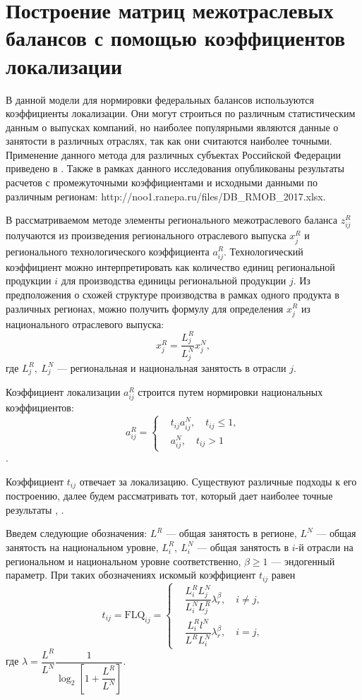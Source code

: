 \documentclass[12pt, a4paper]{article}
\begin{document}
\section{Построение матриц межотраслевых балансов с помощью коэффициентов локализации}

В данной модели для нормировки федеральных балансов используются коэффициенты локализации. Они могут строиться по различным статистическим данным о выпусках компаний, но наиболее популярными являются данные о занятости в различных отраслях, так как они считаются наиболее точными. Применение данного метода для различных субъектах Российской Федерации приведено в \cite{MOB_loc_base}. Также в рамках данного исследования опубликованы результаты расчетов с промежуточными коэффициентами и исходными данными по различным регионам: 
http://noo1.ranepa.ru/files/DB\_RMOB\_2017.xlsx. 

В рассматриваемом методе элементы регионального межотраслевого баланса $z_{ij}^R$ получаются из произведения регионального отраслевого выпуска $x_j^R$ и регионального технологического коэффициента $a_{ij}^R$. Технологический коэффициент можно интерпретировать как количество единиц региональной продукции $i$ для производства единицы региональной продукции $j$. Из предположения о схожей структуре производства в рамках одного продукта в различных регионах, можно получить формулу для определения $x_{j}^R$ из национального отраслевого выпуска:
$$
x_j^R = \dfrac{L_j^R}{L_j^N}x_j^N,
$$
где $L_j^R,\ L_j^N$ --- региональная и национальная занятость в отрасли $j$.

Коэффициент локализации $a_{ij}^R$ строится путем нормировки национальных коэффициентов: 
$$a_{ij}^R = \left\{ \begin{aligned}&t_{ij}a_{ij}^N,\quad t_{ij} \leqslant 1,\\&a_{ij}^N,\quad t_{ij} > 1\end{aligned}\right.$$. 

Коэффициент $t_{ij}$ отвечает за локализацию. Существуют различные подходы к его построению, далее будем рассматривать тот, который дает наиболее точные результаты \cite{MOB_Accur}, \cite{MOB_Monte_Carlo}.

Введем следующие обозначения: $L^R$ --- общая занятость в регионе, $L^N$ --- общая занятость на национальном уровне, $L_i^R,\ L_i^N$ --- общая занятость в $i$-й отрасли на региональном и национальном уровне соответственно, $\beta \geqslant 1$ --- эндогенный параметр. При таких обозначениях искомый коэффициент $t_{ij}$ равен
$$
t_{ij} = \mathrm{FLQ}_{ij} = \left\{\begin{aligned}
& \dfrac{L_i^R L_j^N}{L_i^N L_j^R}\lambda_r^\beta,\quad i \neq j,\\
& \dfrac{L_i^R l^N}{L^R L_i^N}\lambda_r^\beta,\quad i=j,
\end{aligned}\right.
$$
где $\lambda = \dfrac{L^R}{L^N}\dfrac{1}{\log_2\left[1 + \dfrac{L^R}{L^N}\right]}$.
\end{document}
